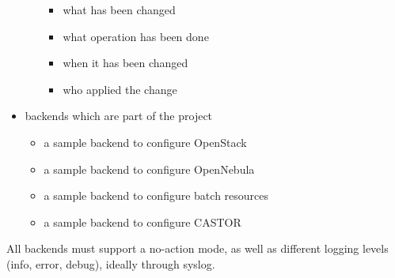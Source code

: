 \begin{itemize}
\begin{itemize}
\begin{itemize}
 \item what has been changed 
 \item what operation has been done 
 \item when it has been changed
 \item who applied the change
\end{itemize}
\end{itemize}
\item backends which are part of the project
\begin{itemize}
\item a sample backend to configure OpenStack
\item a sample backend to configure OpenNebula
\item a sample backend to configure batch resources 
\item a sample backend to configure CASTOR 
\end{itemize}
\end{itemize}
All backends must support a no-action mode, as well as different logging levels (info, error, debug), ideally through syslog.

